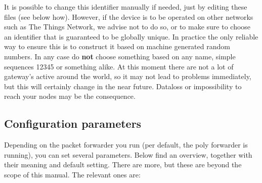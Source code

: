 \documentclass[12pt]{article}
\begin{document}
It is possible to change this identifier manually if
needed, just by editing these files (see below how). However, if the device is to be operated on
other networks such as The Things Network, we
advise not to do so, or to make sure to choose an identifier that is guaranteed to be globally
unique. In practice the only reliable way to ensure this is to construct it based on machine generated
random numbers. In any case do {\bf not} choose something based on any name, simple sequences 12345
or something alike. At this moment there are not a lot of gateway's active around the world, 
so it may not lead to problems immediately, but this will certainly change in the near future.
Dataloss or impossibility to reach your nodes may be the consequence.


\subsection{Configuration parameters}
Depending on the packet forwarder you run (per default, the poly forwarder is running),
you can set several parameters. Below find an overview, together  with their meaning and
default setting. There are more, but these are beyond the scope of this manual. The
relevant ones are:
\end{document}
